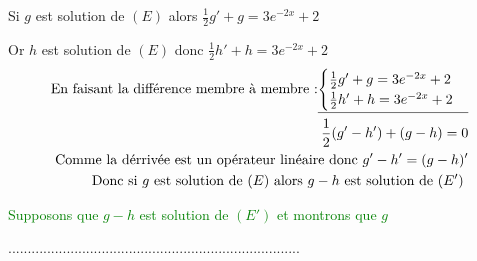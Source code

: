 \documentclass[12pt]{article}
\begin{document}
\begin{enumerate}[label=\arabic*)]
\begin{enumerate}[label=\alph*)]
Si \( g \) est solution de \( (E) \) alors \( \frac{1}{2}g'+g = 3e^{-2x}+2  \) 

Or \( h \) est solution de \( (E) \) donc \( \frac{1}{2}h'+h= 3e^{-2x}+2 \)
  				        \begin{align*}
  				         \text{En faisant la différence membre à membre :}
                   \underline{
                   \begin{cases}
  				        	 \frac{1}{2}g'+g = 3e^{-2x}+2\\
  				        	 \frac{1}{2}h'+h= 3e^{-2x}+2
  				        	\end{cases} }\\
\frac{1}{2}(g'-h')+(g-h)=0\\ 
\text{ Comme la dérrivée est un opérateur linéaire donc \( g'-h'=(g-h)' \)}\\
\text{Donc si \( g \) est solution de \( (E) \) alors \( g-h \) est solution de \( (E') \) }
  				        \end{align*}
  				         
         \textcolor{green}{Supposons que \( g-h \) est solution de \( (E') \) et montrons que \( g \)}


					...........................................................................         
         
    \end{enumerate}
\end{enumerate}
\end{document}
